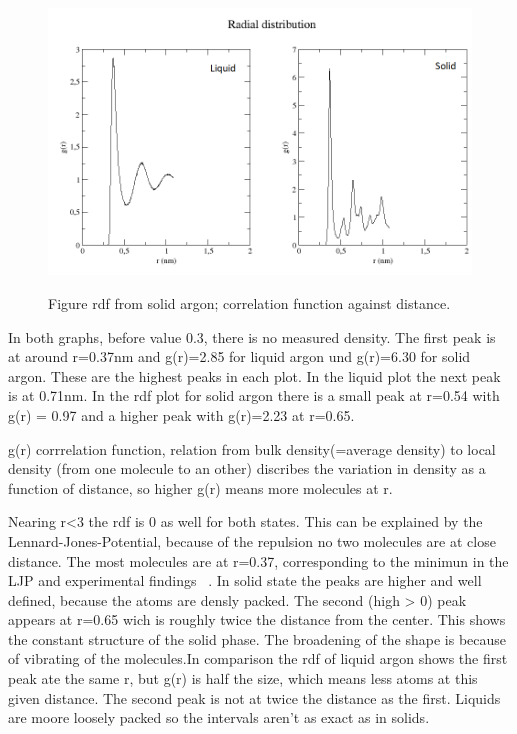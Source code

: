 \documentclass[10pt, a4paper, oneside, twocolumn]{report}
\begin{document}
\begin{figure}
	\centering
		\includegraphics[width=\linewidth]{plots/rdf.png}
		\label{fig:1a}
\caption{Figure rdf from solid argon; correlation function against distance.}
\end{figure}

In both graphs, before value 0.3, there is no measured density. The first peak is at around r=0.37nm and g(r)=2.85 for liquid argon und g(r)=6.30 for solid argon. These are the highest peaks in each plot. In the liquid plot the next peak is at 0.71nm. In the rdf plot for solid argon there is a small peak at r=0.54 with g(r) = 0.97 and a higher peak with g(r)=2.23 at r=0.65.

g(r) corrrelation function, relation from bulk density(=average density) to local density (from one molecule to an other) discribes the variation in density as a function of distance, so higher g(r) means more molecules at r.

Nearing r<3 the rdf is 0 as well for both states. This can be explained by the Lennard-Jones-Potential, because of the repulsion no two molecules are at close distance. The most molecules are at r=0.37, corresponding to the minimun in the LJP and experimental findings ~\cite{Argon, RDF}.
In solid state the peaks are higher and well defined, because the atoms are densly packed. The second (high > 0) peak appears at r=0.65 wich is roughly twice the distance from the center. This shows the constant structure of the solid phase. The broadening of the shape is because of vibrating of the molecules.In comparison the rdf of liquid argon shows the first peak ate the same r, but g(r) is half the size, which means less atoms at this given distance. The second peak is not at twice the distance as the first. Liquids are moore loosely packed so the intervals aren't as exact as in solids.
\end{document}
